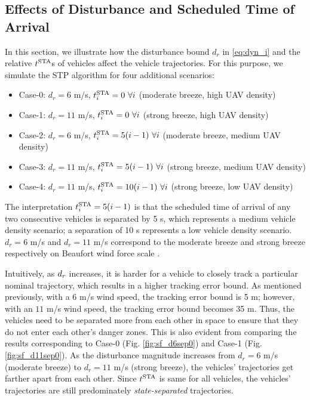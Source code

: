 \subsection{Effects of Disturbance and Scheduled Time of Arrival \label{sec:city_distbEffect}}
In this section, we illustrate how the disturbance bound $d_r$ in \eqref{eq:dyn_i} and the relative $t^\text{STA}$s of vehicles affect the vehicle trajectories. For this purpose, we simulate the STP algorithm for four additional scenarios:
\begin{itemize}
\item Case-0: $d_r = 6$ m/s, $t^\text{STA}_i = 0 ~\forall i$ (moderate breeze, high UAV density)
\item Case-1: $d_r = 11$ m/s, $t^\text{STA}_i = 0 ~\forall i$ (strong breeze, high UAV density)
\item Case-2: $d_r = 6$ m/s, $t^\text{STA}_i = 5(i-1) ~\forall i$ (moderate breeze, medium UAV density)
\item Case-3: $d_r = 11$ m/s, $t^\text{STA}_i = 5(i-1) ~\forall i$ (strong breeze, medium UAV density)
\item Case-4: $d_r = 11$ m/s, $t^\text{STA}_i = 10(i-1) ~\forall i$ (strong breeze, low UAV density)
\end{itemize}
The interpretation $t^\text{STA}_i = 5(i-1)$ is that the scheduled time of arrival of any two consecutive vehicles is separated by 5 s, which represents a medium vehicle density scenario; a separation of 10 s represents a low vehicle density scenario. $d_r = 6$ m/s and $d_r = 11$ m/s correspond to the moderate breeze and strong breeze respectively on Beaufort wind force scale \cite{Windscale}. 

Intuitively, as $d_r$ increases, it is harder for a vehicle to closely track a particular nominal trajectory, which results in a higher tracking error bound. As mentioned previously, with a $6$ m/s wind speed, the tracking error bound is 5 m; however, with an $11$ m/s wind speed, the tracking error bound becomes 35 m. Thus, the vehicles need to be separated more from each other in space to ensure that they do not enter each other's danger zones. This is also evident from comparing the results corresponding to Case-0 (Fig. \ref{fig:sf_d6sep0}) and Case-1 (Fig. \ref{fig:sf_d11sep0}). As the disturbance magnitude increases from $d_r = 6$ m/s (moderate breeze) to $d_r = 11$ m/s (strong breeze), the vehicles' trajectories get farther apart from each other. Since $t^\text{STA}$ is same for all vehicles, the vehicles’ trajectories are still predominately \textit{state-separated} trajectories.

